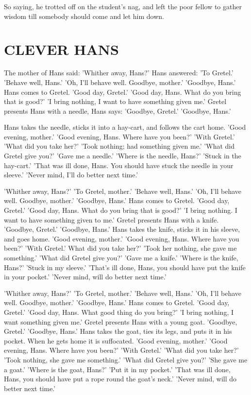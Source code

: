 \documentclass[12pt]{book}
\begin{document}
So saying, he trotted off on the student's nag, and left the poor
fellow to gather wisdom till somebody should come and let him down.



\chapter{CLEVER HANS}

The mother of Hans said: 'Whither away, Hans?' Hans answered: 'To
Gretel.' 'Behave well, Hans.' 'Oh, I'll behave well. Goodbye, mother.'
'Goodbye, Hans.' Hans comes to Gretel. 'Good day, Gretel.' 'Good day,
Hans. What do you bring that is good?' 'I bring nothing, I want to
have something given me.' Gretel presents Hans with a needle, Hans
says: 'Goodbye, Gretel.' 'Goodbye, Hans.'

Hans takes the needle, sticks it into a hay-cart, and follows the cart
home. 'Good evening, mother.' 'Good evening, Hans. Where have you
been?' 'With Gretel.' 'What did you take her?' 'Took nothing; had
something given me.' 'What did Gretel give you?' 'Gave me a needle.'
'Where is the needle, Hans?' 'Stuck in the hay-cart.' 'That was ill
done, Hans. You should have stuck the needle in your sleeve.' 'Never
mind, I'll do better next time.'

'Whither away, Hans?' 'To Gretel, mother.' 'Behave well, Hans.' 'Oh,
I'll behave well. Goodbye, mother.' 'Goodbye, Hans.' Hans comes to
Gretel. 'Good day, Gretel.' 'Good day, Hans. What do you bring that is
good?' 'I bring nothing. I want to have something given to me.' Gretel
presents Hans with a knife. 'Goodbye, Gretel.' 'Goodbye, Hans.' Hans
takes the knife, sticks it in his sleeve, and goes home. 'Good
evening, mother.' 'Good evening, Hans. Where have you been?' 'With
Gretel.' What did you take her?' 'Took her nothing, she gave me
something.' 'What did Gretel give you?' 'Gave me a knife.' 'Where is
the knife, Hans?' 'Stuck in my sleeve.' 'That's ill done, Hans, you
should have put the knife in your pocket.' 'Never mind, will do better
next time.'

'Whither away, Hans?' 'To Gretel, mother.' 'Behave well, Hans.' 'Oh,
I'll behave well. Goodbye, mother.' 'Goodbye, Hans.' Hans comes to
Gretel. 'Good day, Gretel.' 'Good day, Hans. What good thing do you
bring?' 'I bring nothing, I want something given me.' Gretel presents
Hans with a young goat. 'Goodbye, Gretel.' 'Goodbye, Hans.' Hans takes
the goat, ties its legs, and puts it in his pocket. When he gets home
it is suffocated. 'Good evening, mother.' 'Good evening, Hans. Where
have you been?' 'With Gretel.' 'What did you take her?' 'Took nothing,
she gave me something.' 'What did Gretel give you?' 'She gave me a
goat.' 'Where is the goat, Hans?' 'Put it in my pocket.' 'That was ill
done, Hans, you should have put a rope round the goat's neck.' 'Never
mind, will do better next time.'
\end{document}
